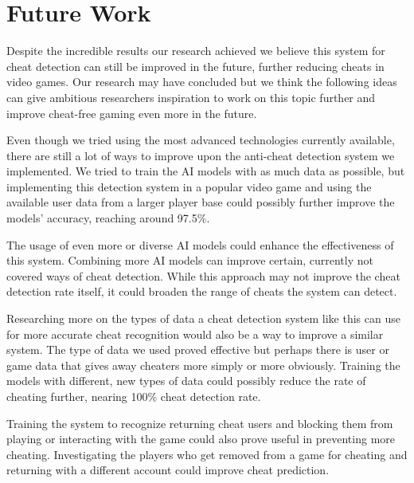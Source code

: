 \section{Future Work}
\label{ch:future}

Despite the incredible results our research achieved we believe this system for cheat detection can still be improved in the future, further reducing cheats in video games. Our research may have concluded but we think the following ideas can give ambitious researchers inspiration to work on this topic further and improve cheat-free gaming even more in the future.

Even though we tried using the most advanced technologies currently available, there are still a lot of ways to improve upon the anti-cheat detection system we implemented. We tried to train the AI models with as much data as possible, but implementing this detection system in a popular video game and using the available user data from a larger player base could possibly further improve the models’ accuracy, reaching around 97.5\%. 

The usage of even more or diverse AI models could enhance the effectiveness of this system. Combining more AI models can improve certain, currently not covered ways of cheat detection. While this approach may not improve the cheat detection rate itself, it could broaden the range of cheats the system can detect.

Researching more on the types of data a cheat detection system like this can use for more accurate cheat recognition would also be a way to improve a similar system. The type of data we used proved effective but perhaps there is user or game data that gives away cheaters more simply or more obviously. Training the models with different, new types of data could possibly reduce the rate of cheating further, nearing 100\% cheat detection rate. 

Training the system to recognize returning cheat users and blocking them from playing or interacting with the game could also prove useful in preventing more cheating. Investigating the players who get removed from a game for cheating and returning with a different account could improve cheat prediction.